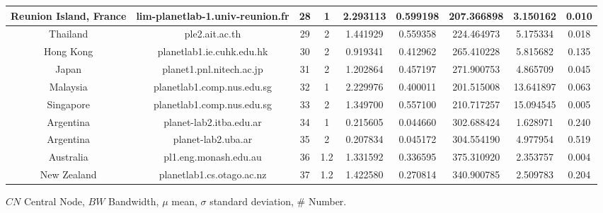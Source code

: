 \begin{longtable}{c c c c c c c c c}
        Reunion Island, France & lim-planetlab-1.univ-reunion.fr & 28 & 1  &2.293113&0.599198&207.366898&3.150162&0.010\\\hline
        Thailand & ple2.ait.ac.th                       & 29  &  2 &1.441929&0.559358&224.464973&5.175334&0.018\\\hline
        Hong Kong & planetlab1.ie.cuhk.edu.hk           & 30  &  2 &0.919341&0.412962&265.410228&5.815682&0.135\\\hline
        Japan & planet1.pnl.nitech.ac.jp                & 31  &  2 &1.202864&0.457197&271.900753&4.865709&0.045\\\hline
        Malaysia & planetlab1.comp.nus.edu.sg           & 32  &  1 &2.229976&0.400011&201.515008&13.641897&0.063\\\hline
        Singapore & planetlab1.comp.nus.edu.sg          & 33  &  2 &1.349700&0.557100&210.717257&15.094545&0.005\\\hline
        Argentina & planet-lab2.itba.edu.ar             & 34  &  1 &0.215605&0.044660&302.688424&1.628971&0.240\\\hline
        Argentina  & planet-lab2.uba.ar                 & 35  &  2 &0.207834&0.045172&304.554190&4.977954&0.519\\\hline
        Australia & pl1.eng.monash.edu.au               & 36  &1.2 &1.331592&0.336595&375.310920&2.353757&0.004\\\hline
        New Zealand & planetlab1.cs.otago.ac.nz         & 37  &1.2 &1.422580&0.270814&340.900785&2.509783&0.204\\\hline
\end{longtable}
\begin{flushleft}
\hspace{1cm}$CN$ Central Node, $BW$ Bandwidth, $\mu$ mean, $\sigma$ standard deviation, $\#$ Number.
\end{flushleft}

